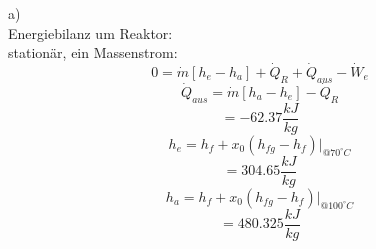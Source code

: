 a) \\
Energiebilanz um Reaktor: \\
stationär, ein Massenstrom: \\
\[
0 = \dot{m} [h_e - h_a] + \dot{Q}_R + \dot{Q}_{aus} - \dot{W}_e
\]
\[
\dot{Q}_{aus} = \dot{m} [h_a - h_e] - \dot{Q}_R
\]
\[
= -62.37 \frac{kJ}{kg}
\]
\[
h_e = h_f + x_0 (h_{fg} - h_f) \bigg|_{@70^\circ C}
\]
\[
= 304.65 \frac{kJ}{kg}
\]
\[
h_a = h_f + x_0 (h_{fg} - h_f) \bigg|_{@100^\circ C}
\]
\[
= 480.325 \frac{kJ}{kg}
\]